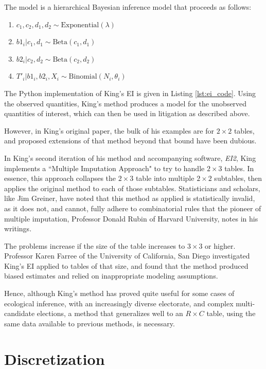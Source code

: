 The model is a hierarchical Bayesian inference model that proceeds as follows:

\begin{enumerate}
 \item $c_1, c_2, d_1, d_2 \sim \text{Exponential}(\lambda)$
 \item $b1_i | c_1, d_1 \sim \text{Beta}(c_1, d_1)$
 \item $b2_i | c_2, d_2 \sim \text{Beta}(c_2, d_2)$
 \item $T'_i | b1_i, b2_i, X_i \sim \text{Binomial}(N_i, \theta_i)$
\end{enumerate}

The Python implementation of King's EI is given in Listing \ref{lst:ei_code}. Using the observed quantities, King's method produces a model for the unobserved quantities of interest, which can then be used in litigation as described above.

However, in King's original paper, the bulk of his examples are for $2 \times 2$ tables, and proposed extensions of that method beyond that bound have been dubious.

In King's second iteration of his method and accompanying software, \textit{EI2}, King implements a ``Multiple Imputation Approach" to try to handle $2 \times 3$ tables. In essence, this approach collapses the $2 \times 3$ table into multiple $2 \times 2$ subtables, then applies the original method to each of those subtables.\cite{king2013} Statisticians and scholars, like Jim Greiner, have noted that this method as applied is statistically invalid, as it does not, and cannot, fully adhere to combinatorial rules that the pioneer of multiple imputation, Professor Donald Rubin of Harvard University, notes in his writings.\cite{rubin}

The problems increase if the size of the table increases to $3 \times 3$ or higher. Professor Karen Farree of the University of California, San Diego investigated King's EI applied to tables of that size, and found that the method produced biased estimates and relied on inappropriate modeling assumptions.\cite{ferree}

Hence, although King's method has proved quite useful for some cases of ecological inference, with an increasingly diverse electorate, and complex multi-candidate elections, a method that generalizes well to an $R \times C$ table, using the same data available to previous methods, is necessary.


\section{Discretization}

